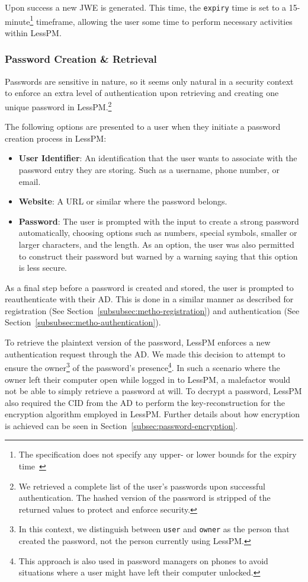 Upon success a new JWE is generated.
This time, the \texttt{expiry} time is set to a 15-minute\footnote{
  The specification does not specify any upper- or lower bounds for the
  expiry time~\cite{RFC7519}
} timeframe, allowing the user some time to perform necessary activities
within LessPM\@.

\subsubsection{Password Creation \& Retrieval}\label{subsubsec:creation-and-retrieval}
Passwords are sensitive in nature, so it seems only natural in a security
context to enforce an extra level of authentication upon retrieving and creating
one unique password in LessPM.\footnote{
  We retrieved a complete list of the user's passwords upon successful authentication.
  The hashed version of the password is stripped of the returned values to protect and enforce security.
}

The following options are presented to a user when they initiate a password
creation process in LessPM:

\begin{itemize}
  \item \textbf{User Identifier}: An identification that the user wants to
  associate with the password entry they are storing.
  Such as a username, phone number, or email.
  \item \textbf{Website}: A URL or similar where the password belongs.
  \item \textbf{Password}: The user is prompted with the input to create a
  strong password automatically, choosing options such as numbers, special
  symbols, smaller or larger characters, and the length.
  As an option, the user was also permitted to construct their password but
  warned by a warning saying that this option is less secure.
\end{itemize}

As a final step before a password is created and stored, the user is prompted to
reauthenticate with their AD\@.
This is done in a similar manner as described for registration (See
Section~\ref{subsubsec:metho-registration}) and authentication (See
Section~\ref{subsubsec:metho-authentication}).

To retrieve the plaintext version of the password, LessPM enforces a new
authentication request through the AD\@.
We made this decision to attempt to ensure the owner\footnote{
  In this context, we distinguish between \texttt{user} and \texttt{owner}
  as the person that created the password, not the person currently using
  LessPM.
} of
the password's presence\footnote{
  This approach is also used in password managers on phones to avoid situations
  where a user might have left their computer unlocked.
}.
In such a scenario where the owner left their computer open while logged in to
LessPM, a malefactor would not be able to simply retrieve a password at will.
To decrypt a password, LessPM also required the CID from the AD to perform
the key-reconstruction for the encryption algorithm employed in LessPM\@.
Further details about how encryption is achieved can be seen in
Section~\ref{subsec:password-encryption}.